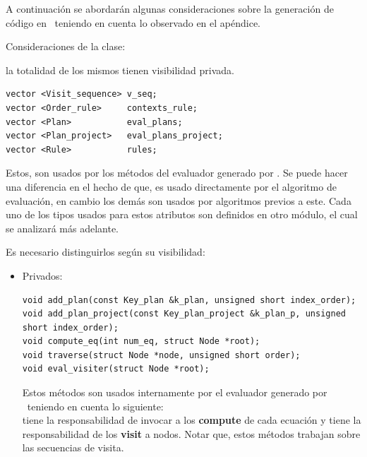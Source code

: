 A continuación se abordarán algunas consideraciones sobre la generación de código en \maggen\ teniendo en cuenta lo observado en el apéndice.

Consideraciones de la clase:

\begin{description}
\setlength{\itemindent}{1em}
\setlength{\leftmargin}{1em}

\item [Atributos] la totalidad de los mismos tienen visibilidad privada.

\begin{lstlisting}[backgroundcolor=\color{white}, linewidth=9.5cm]
vector <Visit_sequence> v_seq;
vector <Order_rule>     contexts_rule;
vector <Plan>           eval_plans;
vector <Plan_project>   eval_plans_project;
vector <Rule>           rules;
\end{lstlisting}

Estos, son usados por los métodos del evaluador generado por \maggen. Se puede hacer una diferencia en el hecho de que,  es usado directamente por el algoritmo de evaluación, en cambio los demás son usados por algoritmos previos a este. Cada uno de los tipos usados para estos atributos son definidos en otro módulo, el cual se analizará más adelante.

\item [Métodos] Es necesario distinguirlos según su visibilidad:

\begin{itemize}
\setlength{\itemindent}{1em}
\setlength{\leftmargin}{1em}
\item Privados:

\begin{lstlisting}[backgroundcolor=\color{white}, columns=fullflexible]
void add_plan(const Key_plan &k_plan, unsigned short index_order);
void add_plan_project(const Key_plan_project &k_plan_p, unsigned short index_order);
void compute_eq(int num_eq, struct Node *root);
void traverse(struct Node *node, unsigned short order);
void eval_visiter(struct Node *root);
\end{lstlisting}

Estos métodos son usados internamente por el evaluador generado por \maggen\ teniendo en cuenta lo siguiente:\\
 tiene la responsabilidad de invocar a los \textbf{compute} de cada ecuación y  tiene la responsabilidad de los \textbf{visit} a nodos. Notar que, estos métodos trabajan sobre las secuencias de visita.


\end{itemize}
\end{description}
